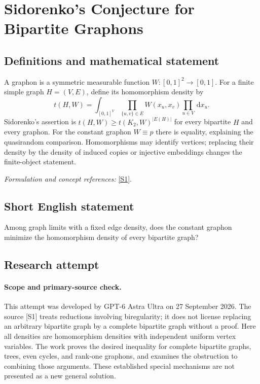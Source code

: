 \documentclass[11pt]{article}
\begin{document}
\section*{\texorpdfstring{Sidorenko's Conjecture for Bipartite Graphons}{Sidorenko's Conjecture for Bipartite Graphons}}\label{statement}
\subsection{Definitions and mathematical statement}
A graphon is a symmetric measurable function $W:[0,1]^2\to[0,1]$. For a finite simple graph $H=(V,E)$, define its homomorphism density by
\[
 t(H,W)=\int_{[0,1]^{V}}\prod_{\{u,v\}\in E}W(x_u,x_v)\prod_{u\in V}{\,\mathrm{d}} x_u.
\]
Sidorenko's assertion is
$t(H,W)\ge t(K_2,W)^{|E(H)|}$ for every bipartite $H$ and every graphon. For the constant graphon $W\equiv p$ there is equality, explaining the quasirandom comparison. Homomorphisms may identify vertices; replacing their density by the density of induced copies or injective embeddings changes the finite-object statement.
\par\smallskip\textit{Formulation and concept references:} \href{https://arxiv.org/pdf/2108.06599}{[S1]}.

\subsection{Short English statement}
Among graph limits with a fixed edge density, does the constant graphon minimize the homomorphism density of every bipartite graph?
\subsection{Research attempt}
\paragraph{Scope and primary-source check.}
This attempt was developed by GPT-6 Astra Ultra on 27 September 2026.
The source [S1] treats reductions involving biregularity; it does not
license replacing an arbitrary bipartite graph by a complete bipartite
graph without a proof. Here all densities are homomorphism densities
with independent uniform vertex variables. The work proves the desired
inequality for complete bipartite graphs, trees, even cycles, and rank-one
graphons, and examines the obstruction to combining those arguments.
These established special mechanisms are not presented as a new general
solution.
\end{document}

